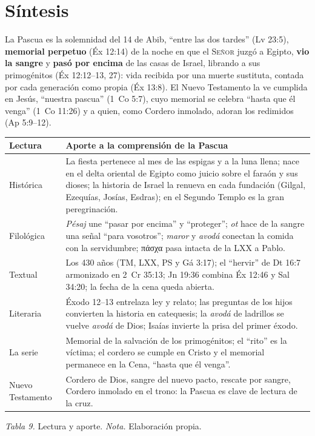 \documentclass[11pt,letterpaper]{article}
\newcommand{\grc}[1]{\foreignlanguage{ancientgreek}{#1}}
\newcommand{\SENOR}{\textsc{Señor}}
\newcommand{\destacar}[1]{\textbf{\textcolor{tierraroja}{#1}}}
\begin{document}
\section{Síntesis}

\begin{tcolorbox}[enhanced,unbreakable,colback=papiro,colframe=tierraroja,boxrule=1pt,arc=3pt,title={Pésaj, la Pascua del \SENOR},fonttitle=\bfseries,colbacktitle=tierraroja,coltitle=papiro]
La Pascua es la solemnidad del 14 de Abib, ``entre las dos tardes'' (Lv 23:5), \destacar{memorial perpetuo} (Éx 12:14) de la noche en que el \SENOR{} juzgó a Egipto, \destacar{vio la sangre} y \destacar{pasó por encima} de las casas de Israel, librando a sus primogénitos (Éx 12:12--13, 27): vida recibida por una muerte sustituta, contada por cada generación como propia (Éx 13:8). El Nuevo Testamento la ve cumplida en Jesús, ``nuestra pascua'' (1~Co 5:7), cuyo memorial se celebra ``hasta que él venga'' (1~Co 11:26) y a quien, como Cordero inmolado, adoran los redimidos (Ap 5:9--12).
\end{tcolorbox}

\begin{table}[!htbp]\centering\small\renewcommand{\arraystretch}{1.22}
\begin{tabular}{@{}L{3.0cm}L{11.4cm}@{}}
\toprule
\textbf{Lectura} & \textbf{Aporte a la comprensión de la Pascua} \\ \midrule
Histórica & La fiesta pertenece al mes de las espigas y a la luna llena; nace en el delta oriental de Egipto como juicio sobre el faraón y sus dioses; la historia de Israel la renueva en cada fundación (Gilgal, Ezequías, Josías, Esdras); en el Segundo Templo es la gran peregrinación. \\
Filológica & \emph{Pésaj} une ``pasar por encima'' y ``proteger''; \emph{ot} hace de la sangre una señal ``para vosotros''; \emph{maror} y \emph{avodá} conectan la comida con la servidumbre; \grc{πάσχα} pasa intacta de la LXX a Pablo. \\
Textual & Los 430 años (TM, LXX, PS y Gá 3:17); el ``hervir'' de Dt 16:7 armonizado en 2~Cr 35:13; Jn 19:36 combina Éx 12:46 y Sal 34:20; la fecha de la cena queda abierta. \\
Literaria & Éxodo 12--13 entrelaza ley y relato; las preguntas de los hijos convierten la historia en catequesis; la \emph{avodá} de ladrillos se vuelve \emph{avodá} de Dios; Isaías invierte la prisa del primer éxodo. \\
La serie & Memorial de la salvación de los primogénitos; el ``rito'' es la víctima; el cordero se cumple en Cristo y el memorial permanece en la Cena, ``hasta que él venga''. \\
Nuevo Testamento & Cordero de Dios, sangre del nuevo pacto, rescate por sangre, Cordero inmolado en el trono: la Pascua es clave de lectura de la cruz. \\
\bottomrule
\end{tabular}\par
{\footnotesize\color{sepia}\textit{Tabla 9.} Lectura y aporte. \textit{Nota.} Elaboración propia.}
\end{table}
\end{document}
